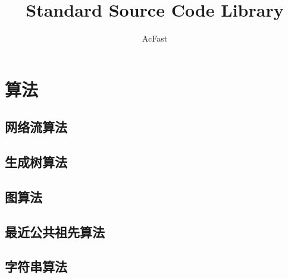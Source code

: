 \documentclass[12pt,a4paper,titlepage]{article}
\author{AcFast}
\title{Standard Source Code Library}
\begin{document}

\maketitle
\tableofcontents

\newpage
\section{\LARGE 算法}

    \subsection{网络流算法}
    
    
    
    
    
    


    \subsection{生成树算法}
	


    \subsection{图算法}
    
    
	

    

    \subsection{最近公共祖先算法}
    
    

    \subsection{字符串算法}
    
    
    
    
\end{document}
